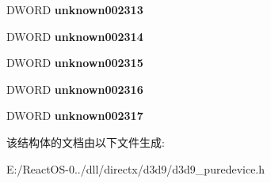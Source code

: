 \begin{DoxyCompactItemize}
\mbox{\label{struct___d3_d9_p_u_r_e_d_e_v_i_c_e_a63e5e2defef4174215fec8316df42254}} 
D\+W\+O\+RD {\bfseries unknown002313}
\item 
\mbox{\label{struct___d3_d9_p_u_r_e_d_e_v_i_c_e_a67190bca8ff3182c82385938d2422e60}} 
D\+W\+O\+RD {\bfseries unknown002314}
\item 
\mbox{\label{struct___d3_d9_p_u_r_e_d_e_v_i_c_e_afb09f59659a8b5cedfe1178aa4c3580e}} 
D\+W\+O\+RD {\bfseries unknown002315}
\item 
\mbox{\label{struct___d3_d9_p_u_r_e_d_e_v_i_c_e_a210900a77c3d10a5623a114841a30419}} 
D\+W\+O\+RD {\bfseries unknown002316}
\item 
\mbox{\label{struct___d3_d9_p_u_r_e_d_e_v_i_c_e_a20b1af6c7bc80bb41cbb34a2e9fba6f5}} 
D\+W\+O\+RD {\bfseries unknown002317}
\end{DoxyCompactItemize}


该结构体的文档由以下文件生成\+:\begin{DoxyCompactItemize}
\item 
E\+:/\+React\+O\+S-\/0../dll/directx/d3d9/d3d9\+\_\+puredevice.\+h\end{DoxyCompactItemize}
